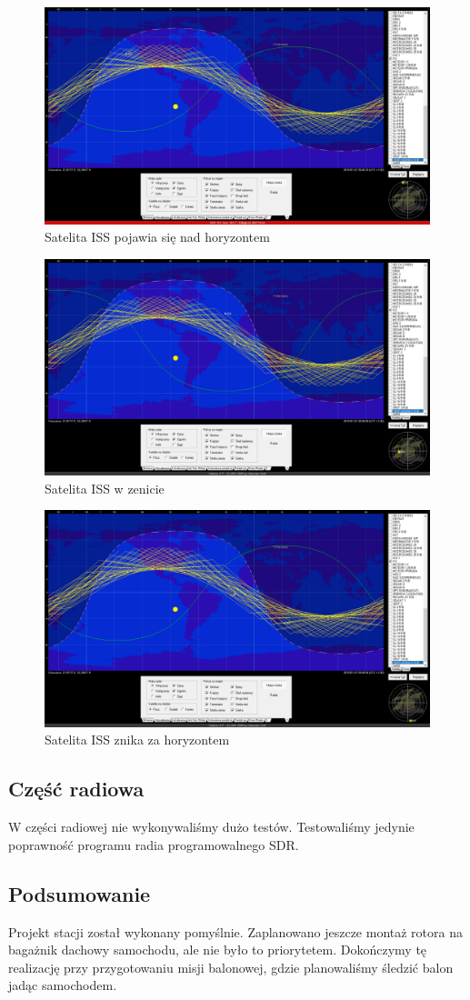 \begin{figure}[h]
	\centering
		\includegraphics[width=0.7 \textwidth]{testy/pojawia}
	\caption{Satelita ISS pojawia się nad horyzontem}	
	\label{fig:pojawia}
\end{figure}


\begin{figure}[h]
	\centering
		\includegraphics[width=0.7 \textwidth]{testy/zenit}
	\caption{Satelita ISS w zenicie}	
	\label{fig:zenit}
\end{figure}


\begin{figure}[h]
	\centering
		\includegraphics[width=0.7 \textwidth]{testy/znika}
	\caption{Satelita ISS znika za horyzontem}	
	\label{fig:zanika}
\end{figure}




\subsection{Część radiowa}

W części radiowej nie wykonywaliśmy dużo testów. Testowaliśmy jedynie poprawność programu radia programowalnego SDR.

\subsection{Podsumowanie}

Projekt stacji został wykonany pomyślnie. Zaplanowano jeszcze montaż rotora na bagażnik dachowy samochodu, ale nie było to priorytetem. Dokończymy tę realizację przy przygotowaniu misji balonowej, gdzie planowaliśmy śledzić balon jadąc samochodem.
